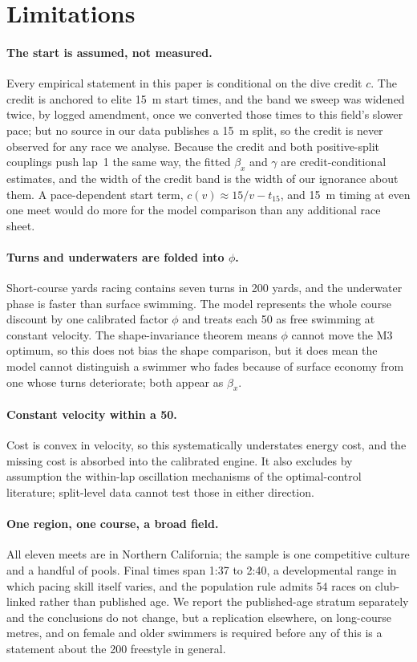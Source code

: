 \section{Limitations}\label{sec:limitations}

\paragraph{The start is assumed, not measured.} Every empirical statement in
this paper is conditional on the dive credit $c$. The credit is anchored to
elite 15~m start times, and the band we sweep was widened twice, by logged
amendment, once we converted those times to this field's slower pace; but
no source in our data publishes a 15~m split, so the credit is never
observed for any race we analyse. Because the credit and both positive-split
couplings push lap~1 the same way, the fitted $\beta_x$ and $\gamma$ are
credit-conditional estimates, and the width of the credit band is the width
of our ignorance about them. A pace-dependent start term,
$c(v) \approx 15/v - t_{15}$, and 15~m timing at even one meet would do more
for the model comparison than any additional race sheet.

\paragraph{Turns and underwaters are folded into $\phi$.} Short-course yards
racing contains seven turns in 200 yards, and the underwater phase is faster
than surface swimming. The model represents the whole course discount by one
calibrated factor $\phi$ and treats each 50 as free swimming at constant
velocity. The shape-invariance theorem means $\phi$ cannot move the M3
optimum, so this does not bias the shape comparison, but it does mean the
model cannot distinguish a swimmer who fades because of surface economy from
one whose turns deteriorate; both appear as $\beta_x$.

\paragraph{Constant velocity within a 50.} Cost is convex in velocity, so
this systematically understates energy cost, and the missing cost is absorbed
into the calibrated engine. It also excludes by assumption the within-lap
oscillation mechanisms of the optimal-control literature; split-level data
cannot test those in either direction.

\paragraph{One region, one course, a broad field.} All eleven meets are in
Northern California; the sample is one competitive culture and a handful of
pools. Final times span 1:37 to 2:40, a developmental range in which pacing
skill itself varies, and the population rule admits 54 races on club-linked
rather than published age. We report the published-age stratum separately
and the conclusions do not change, but a replication elsewhere, on
long-course metres, and on female and older swimmers is required before any
of this is a statement about the 200 freestyle in general.

